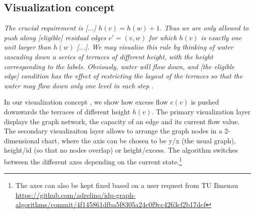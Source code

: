  
\clearpage
\subsection{Visualization concept}
\textit{The crucial requirement is [...] $h(v) = h(w) + 1$. Thus we are only allowed to push along [eligible] residual edges $e'=(v,w)$ for which $h(v)$ is exactly one unit larger than $h(w)$ [...]. We may visualize this rule by thinking of water cascading down a series of terraces of different height, with the height corresponding to the labels. Obviously, water will flow down, and [the eligible edge] condition has the effect of restricting the layout of the terraces so that the water may flow down only one level in each step} \cite[sec. 6.6]{jungnickel2013graphs}.

In our visualization concept , we show how excess flow $e(v)$ is pushed downwards the terraces of different height $h(v)$. The primary visualization layer displays the graph network, the capacity of an edge and its current flow value. The secondary visualizaiton layer allows to arrange the graph nodes in a 2-dimensional chart, where the axis can be chosen to be y/x (the usual graph), height/id (so that no nodes overlap) or height/excess. The algorithm switches between the different axes depending on the current state.\footnote{The axes can also be kept fixed based on a user request from TU Ilmenau \url{https://github.com/adrelino/idp-graph-algorithms/commit/4f145861dfba5f8305a24c0f9cc4263cf2b17dcf}}

